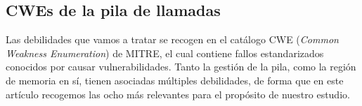 \documentclass[12pt, a4paper, twoside]{article}
\begin{document}

\subsection{CWEs de la pila de llamadas}
\label{sec:cwe-stack}
Las debilidades que vamos a tratar se recogen en el catálogo CWE (\textit{Common Weakness Enumeration}) de MITRE, el cual contiene fallos estandarizados conocidos por causar vulnerabilidades. Tanto la gestión de la pila, como la región de memoria en sí, tienen asociadas múltiples debilidades, de forma que en este artículo recogemos las ocho más relevantes para el propósito de nuestro estudio.
\end{document}
